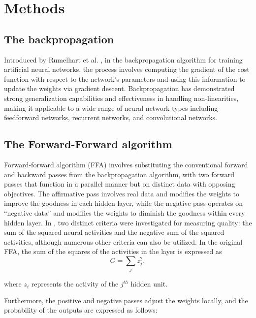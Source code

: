 \documentclass{article}
\begin{document}
\section{Methods}\label{sec:ffn}


\subsection{The backpropagation}
Introduced by Rumelhart et al. \cite{rumelhart1986learning, rumelhart1985learning}, in the backpropagation algorithm for training artificial neural networks, the process involves computing the gradient of the cost function with respect to the network's parameters and using this information to update the weights via gradient descent. Backpropagation has demonstrated strong generalization capabilities and effectiveness in handling non-linearities, making it applicable to a wide range of neural network types including feedforward networks, recurrent networks, and convolutional networks.


\subsection{The Forward-Forward algorithm}
Forward-forward algorithm (FFA) \cite{hinton2022forward} involves substituting the conventional forward and backward passes from the backpropagation algorithm, with two forward passes that function in a parallel manner but on distinct data with opposing objectives. The affirmative pass involves real data and modifies the weights to improve the goodness in each hidden layer, while the negative pass operates on ``negative data'' and modifies the weights to diminish the goodness within every hidden layer. In \cite{hinton2022forward}, two distinct criteria were investigated for measuring quality: the sum of the squared neural activities and the negative sum of the squared activities, although numerous other criteria can also be utilized. In the original FFA, the sum of the squares of the activities in the layer is expressed as
\begin{equation}
    G=\sum_j z^2_{j}, %
\end{equation}


\noindent where $z_i$ represents the   activity of the $j^{th}$ hidden unit. %

Furthermore, the positive and negative passes adjust the weights locally, and the probability of the outputs are expressed as follows:
\end{document}
